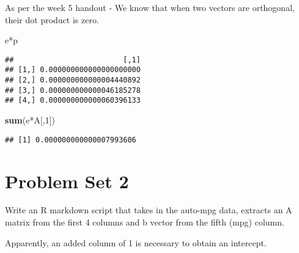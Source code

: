 \documentclass[]{article}
\newenvironment{Shaded}{\begin{snugshade}}{\end{snugshade}}
\newcommand{\KeywordTok}[1]{\textcolor[rgb]{0.13,0.29,0.53}{\textbf{{#1}}}}
\newcommand{\DecValTok}[1]{\textcolor[rgb]{0.00,0.00,0.81}{{#1}}}
\newcommand{\StringTok}[1]{\textcolor[rgb]{0.31,0.60,0.02}{{#1}}}
\newcommand{\NormalTok}[1]{{#1}}
\begin{document}
As per the week 5 handout - We know that when two vectors are
orthogonal, their dot product is zero.

\begin{Shaded}
\begin{Highlighting}[]
\NormalTok{e*p}
\end{Highlighting}
\end{Shaded}

\begin{verbatim}
##                         [,1]
## [1,] 0.000000000000000000000
## [2,] 0.000000000000004440892
## [3,] 0.000000000000046185278
## [4,] 0.000000000000060396133
\end{verbatim}

\begin{Shaded}
\begin{Highlighting}[]
\KeywordTok{sum}\NormalTok{(e*A[,}\DecValTok{1}\NormalTok{])}
\end{Highlighting}
\end{Shaded}

\begin{verbatim}
## [1] 0.000000000000007993606
\end{verbatim}

\section{Problem Set 2}\label{problem-set-2}

Write an R markdown script that takes in the auto-mpg data, extracts an
A matrix from the first 4 columns and b vector from the fifth (mpg)
column.

Apparently, an added column of 1 is necessary to obtain an intercept.

\begin{Shaded}
\end{Shaded}
\end{document}
